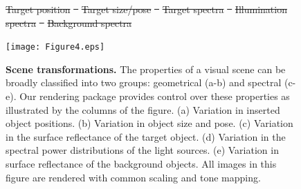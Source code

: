 \documentclass{jov}
\providecommand{\DIFdeltex}[1]{{\protect\color{red}\sout{#1}}}                      %
\providecommand{\DIFaddend}{} %
\providecommand{\DIFdelFL}[1]{\DIFdel{#1}} %
\providecommand{\DIFaddbeginFL}{} %
\providecommand{\DIFaddendFL}{} %
\providecommand{\DIFdelbeginFL}{} %
\providecommand{\DIFdelendFL}{} %
\providecommand{\DIFdel}[1]{\texorpdfstring{\DIFdeltex{#1}}{}} %
\newcommand{\DIFscaledelfig}{0.5}
\newlength{\DIFdelgraphicswidth} %
\newlength{\DIFdelgraphicsheight} %
\newcommand{\DIFaddincludegraphics}[2][]{{\color{blue}\fbox{\DIFOincludegraphics[#1]{#2}}}} %
\newcommand{\DIFdelincludegraphics}[2][]{%
\sbox{\DIFdelgraphicsbox}{\DIFOincludegraphics[#1]{#2}}%
\settoboxwidth{\DIFdelgraphicswidth}{\DIFdelgraphicsbox} %
\settoboxtotalheight{\DIFdelgraphicsheight}{\DIFdelgraphicsbox} %
\scalebox{\DIFscaledelfig}{%
\parbox[b]{\DIFdelgraphicswidth}{\usebox{\DIFdelgraphicsbox}\\[-\baselineskip] \rule{\DIFdelgraphicswidth}{0em}}\llap{\resizebox{\DIFdelgraphicswidth}{\DIFdelgraphicsheight}{%
\setlength{\unitlength}{\DIFdelgraphicswidth}%
\begin{picture}(1,1)%
\thicklines\linethickness{2pt} %
{\color[rgb]{1,0,0}\put(0,0){\framebox(1,1){}}}%
{\color[rgb]{1,0,0}\put(0,0){\line( 1,1){1}}}%
{\color[rgb]{1,0,0}\put(0,1){\line(1,-1){1}}}%
\end{picture}%
}\hspace*{3pt}}} %
} %
\DeclareRobustCommand{\DIFaddend}{\DIFOaddend \let\includegraphics\DIFOincludegraphics} %
\DeclareRobustCommand{\DIFaddbeginFL}{\DIFOaddbeginFL \let\includegraphics\DIFaddincludegraphics} %
\DeclareRobustCommand{\DIFaddendFL}{\DIFOaddendFL \let\includegraphics\DIFOincludegraphics} %
\DeclareRobustCommand{\DIFdelbeginFL}{\DIFOdelbeginFL \let\includegraphics\DIFdelincludegraphics} %
\DeclareRobustCommand{\DIFdelendFL}{\DIFOaddendFL \let\includegraphics\DIFOincludegraphics} %
\begin{document}
\DIFaddend %
\begin{figure}
\DIFdelbeginFL %
{%
\DIFdelFL{Target position}}
\DIFdelFL{~
	}%
{%
\DIFdelFL{Target size/pose}}
\DIFdelFL{~
}%
{%
\DIFdelFL{Target spectra}}
\DIFdelFL{~
    }%
{%
\DIFdelFL{Illumination spectra}}
\DIFdelFL{~  
    }%
{%
\DIFdelFL{Background spectra}}

\DIFdelendFL \DIFaddbeginFL \texttt{[image: Figure4.eps]}
    \DIFaddendFL \caption{{\bf Scene transformations.} The properties of a visual scene can be broadly classified into two groups: geometrical (a-b) and spectral (c-e). Our rendering package provides control over these properties as illustrated by the columns of the figure. (a) Variation in inserted object positions. (b) Variation in object size and pose. (c) Variation in the surface reflectance of the target object. (d) Variation in the spectral power distributions of the light sources. (e) Variation in surface reflectance of the background objects. All images in this figure are rendered with common scaling and tone mapping.
\label{fig:VWCCTransformations}}
\end{figure}
\end{document}

